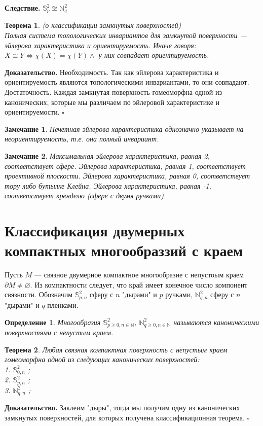 \documentclass[a4paper]{article}
\newtheorem{defin}{Определение}
\newtheorem{zam}{Замечание}
\newtheorem{theor}{Теорема}
\begin{document}
\textbf{Следствие.} $\mathbb{S}^2_p\not\cong \mathbb{N}^2_q$ 

\begin{theor} (о классификации замкнутых поверхностей)\\

    Полная система топологических инвариантов для замкнутой поверхности ---
    эйлерова характеристика и ориентируемость. Иначе говоря:
    $X\cong Y\iff \chi(X) = \chi(Y) \wedge$ у них совпадает ориентируемость. 
\end{theor}
\textbf{Доказательство.} Необходимость. Так как 
эйлерова характеристика и ориентируемость являются топологическими 
инвариантами, то они совпадают. Достаточность. 
Каждая замкнутая поверхность гомеоморфна одной из канонических, которые мы 
различаем по эйлеровой характеристике и ориентируемости.
$\square$ 
\begin{zam}
    Нечетная эйлерова характеристика однозначно указывает на неориентируемость,
    т.е. она полный инвариант. 
\end{zam}
\begin{zam}
    Максимальная эйлерова характеристика, равная 2, соответствует сфере.
    Эйлерова характеристика, равная 1, соответствует проективной плоскости.
    Эйлерова характеристика, равная 0, соответствует тору либо бутылке Клейна.
    Эйлерова характеристика, равная -1, соответствует кренделю (сфере с двумя
    ручками).
\end{zam}
\section{Классификация двумерных компактных многообраззий с краем}
Пусть $M$ --- связное двумерное компактное многообразие с непустоым краем
$\partial M\ne\varnothing$. Из компактности следует, что край имеет 
конечное число компонент связности.
Обозначим $\mathbb{S}^2_{p,n}$ сферу с $n$ "дырами" и $p$ ручками, 
$\mathbb{N}^2_{q,n}$ сферу с $n$ "дырами" и $q$ пленками.
\begin{defin}
    Многообразия $\mathbb{S}^2_{p\geqslant 0,n\in \mathbb{N}}$, 
$\mathbb{N}^2_{q\geqslant 0,n\in \mathbb{N}}$ называются каноническими
поверхностями с непустым краем.
\end{defin}
\begin{theor}
Любая связная компактная поверхность с непустым краем гомеоморфна одной из
следующих канонических поверхностей:\\
1. $\mathbb{S}^2_{0,n}$ ;\\
2. $\mathbb{S}^2_{p,n}$ ;\\
3. $\mathbb{N}^2_{q,n}$ ;\\


\end{theor}
\textbf{Доказательство.}  Заклеим "дыры", тогда мы получим одну из
канонических замкнутых поверхностей, для которых получена классификационная
теорема. 
$\square$ 
\end{document}
